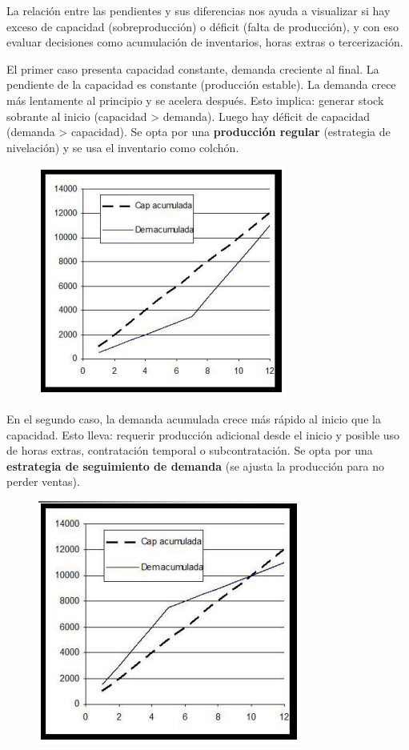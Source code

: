\documentclass[a4paper,oneside,11pt]{article}
\begin{document}
La relación entre las pendientes y sus diferencias nos ayuda a visualizar si hay exceso de capacidad (sobreproducción) o déficit (falta de producción), y con eso evaluar decisiones como acumulación de inventarios, horas extras o tercerización.

El primer caso presenta capacidad constante, demanda creciente al final. La pendiente de la capacidad es constante (producción estable). La demanda crece más lentamente al principio y se acelera después. Esto implica: generar stock sobrante al inicio (capacidad > demanda). Luego hay déficit de capacidad (demanda > capacidad). Se opta por una \textbf{producción regular} (estrategia de nivelación) y se usa el inventario como colchón.
\begin{figure} [ht!]
    \centering
    \includegraphics[scale=.7]{1.png}
\end{figure}

En el segundo caso, la demanda acumulada crece más rápido al inicio que la capacidad. Esto lleva: requerir producción adicional desde el inicio y posible uso de horas extras, contratación temporal o subcontratación. Se opta por una \textbf{estrategia de seguimiento de demanda} (se ajusta la producción para no perder ventas).
\begin{figure} [ht!]
    \centering
    \includegraphics[scale=0.7]{2.png}
\end{figure}
\end{document}
